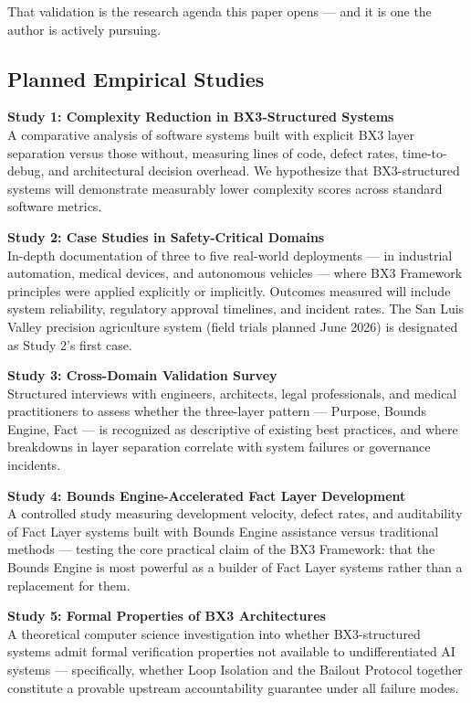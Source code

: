 \documentclass[12pt]{article}
\begin{document}
That validation is the research agenda this paper opens --- and it is one the author is actively pursuing.

\subsection{Planned Empirical Studies}

\textbf{Study 1: Complexity Reduction in BX3-Structured Systems}\\
A comparative analysis of software systems built with explicit BX3 layer separation versus those without, measuring lines of code, defect rates, time-to-debug, and architectural decision overhead. We hypothesize that BX3-structured systems will demonstrate measurably lower complexity scores across standard software metrics.

\textbf{Study 2: Case Studies in Safety-Critical Domains}\\
In-depth documentation of three to five real-world deployments --- in industrial automation, medical devices, and autonomous vehicles --- where BX3 Framework principles were applied explicitly or implicitly. Outcomes measured will include system reliability, regulatory approval timelines, and incident rates. The San Luis Valley precision agriculture system (field trials planned June 2026) is designated as Study 2's first case.

\textbf{Study 3: Cross-Domain Validation Survey}\\
Structured interviews with engineers, architects, legal professionals, and medical practitioners to assess whether the three-layer pattern --- Purpose, Bounds Engine, Fact --- is recognized as descriptive of existing best practices, and where breakdowns in layer separation correlate with system failures or governance incidents.

\textbf{Study 4: Bounds Engine-Accelerated Fact Layer Development}\\
A controlled study measuring development velocity, defect rates, and auditability of Fact Layer systems built with Bounds Engine assistance versus traditional methods --- testing the core practical claim of the BX3 Framework: that the Bounds Engine is most powerful as a builder of Fact Layer systems rather than a replacement for them.

\textbf{Study 5: Formal Properties of BX3 Architectures}\\
A theoretical computer science investigation into whether BX3-structured systems admit formal verification properties not available to undifferentiated AI systems --- specifically, whether Loop Isolation and the Bailout Protocol together constitute a provable upstream accountability guarantee under all failure modes.
\end{document}
